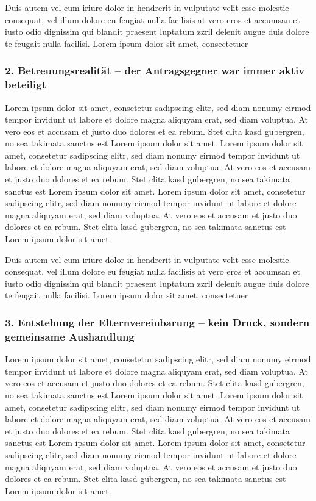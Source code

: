 \documentclass[
  12pt,
  a4paper,
]{article}
\begin{document}
Duis autem vel eum iriure dolor in hendrerit in vulputate velit esse
molestie consequat, vel illum dolore eu feugiat nulla facilisis at vero
eros et accumsan et iusto odio dignissim qui blandit praesent luptatum
zzril delenit augue duis dolore te feugait nulla facilisi. Lorem ipsum
dolor sit amet, consectetuer

\subsubsection{2. Betreuungsrealität -- der Antragsgegner war immer
aktiv
beteiligt}\label{betreuungsrealituxe4t-der-antragsgegner-war-immer-aktiv-beteiligt}

Lorem ipsum dolor sit amet, consetetur sadipscing elitr, sed diam nonumy
eirmod tempor invidunt ut labore et dolore magna aliquyam erat, sed diam
voluptua. At vero eos et accusam et justo duo dolores et ea rebum. Stet
clita kasd gubergren, no sea takimata sanctus est Lorem ipsum dolor sit
amet. Lorem ipsum dolor sit amet, consetetur sadipscing elitr, sed diam
nonumy eirmod tempor invidunt ut labore et dolore magna aliquyam erat,
sed diam voluptua. At vero eos et accusam et justo duo dolores et ea
rebum. Stet clita kasd gubergren, no sea takimata sanctus est Lorem
ipsum dolor sit amet. Lorem ipsum dolor sit amet, consetetur sadipscing
elitr, sed diam nonumy eirmod tempor invidunt ut labore et dolore magna
aliquyam erat, sed diam voluptua. At vero eos et accusam et justo duo
dolores et ea rebum. Stet clita kasd gubergren, no sea takimata sanctus
est Lorem ipsum dolor sit amet.

Duis autem vel eum iriure dolor in hendrerit in vulputate velit esse
molestie consequat, vel illum dolore eu feugiat nulla facilisis at vero
eros et accumsan et iusto odio dignissim qui blandit praesent luptatum
zzril delenit augue duis dolore te feugait nulla facilisi. Lorem ipsum
dolor sit amet, consectetuer

\subsubsection{3. Entstehung der Elternvereinbarung -- kein Druck,
sondern gemeinsame
Aushandlung}\label{entstehung-der-elternvereinbarung-kein-druck-sondern-gemeinsame-aushandlung}

Lorem ipsum dolor sit amet, consetetur sadipscing elitr, sed diam nonumy
eirmod tempor invidunt ut labore et dolore magna aliquyam erat, sed diam
voluptua. At vero eos et accusam et justo duo dolores et ea rebum. Stet
clita kasd gubergren, no sea takimata sanctus est Lorem ipsum dolor sit
amet. Lorem ipsum dolor sit amet, consetetur sadipscing elitr, sed diam
nonumy eirmod tempor invidunt ut labore et dolore magna aliquyam erat,
sed diam voluptua. At vero eos et accusam et justo duo dolores et ea
rebum. Stet clita kasd gubergren, no sea takimata sanctus est Lorem
ipsum dolor sit amet. Lorem ipsum dolor sit amet, consetetur sadipscing
elitr, sed diam nonumy eirmod tempor invidunt ut labore et dolore magna
aliquyam erat, sed diam voluptua. At vero eos et accusam et justo duo
dolores et ea rebum. Stet clita kasd gubergren, no sea takimata sanctus
est Lorem ipsum dolor sit amet.
\end{document}
